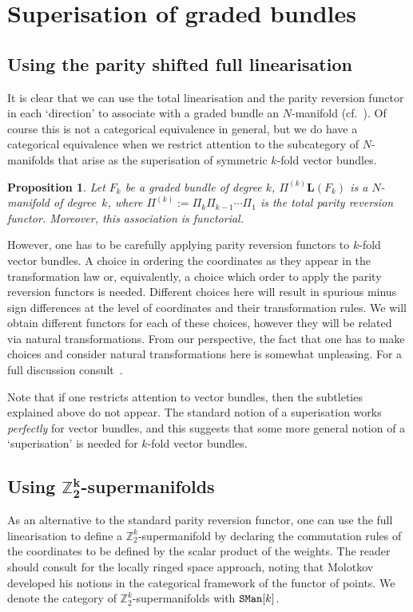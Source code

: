 \documentclass[pdftex]{sigma}
\newcommand{\catname}[1]{\textnormal{\texttt{#1}}}
\def\Linr{{\mathbf{L}}} %
\numberwithin{equation}{section}
\newtheorem{Proposition}[Theorem]{Proposition}
 { \theoremstyle{definition}
\newtheorem{Definition}[Theorem]{Definition}
\newtheorem{Example}[Theorem]{Example}
\newtheorem{Remark}[Theorem]{Remark} }
\begin{document}
\section{Superisation of graded bundles}\label{sec:superisation}

 \subsection{Using the parity shifted full linearisation}
 It is clear that we can use the total linearisation and the parity reversion functor in each `direction' to associate with a graded bundle an $N$-manifold (cf.~\cite{Grabowski:2006,Voronov:2012}). Of course this is not a categorical equivalence in general, but we do have a categorical equivalence when we restrict attention to the subcategory of $N$-manifolds that arise as the superisation of symmetric $k$-fold vector bundles.

 \begin{Proposition}
 Let $F_{k}$ be a graded bundle of degree $k$, $\Pi^{(k)}\Linr(F_{k})$ is a $N$-manifold of degree~$k$, where $\Pi^{(k)} := \Pi_{k} \Pi_{k-1} \cdots \Pi_{1}$ is the total parity reversion functor. Moreover, this association is functorial.
 \end{Proposition}

However, one has to be carefully applying parity reversion functors to $k$-fold vector bundles. A choice in ordering the coordinates as they appear in the transformation law or, equivalently, a choice which order to apply the parity reversion functors is needed. Dif\/ferent choices here will result in spurious minus sign dif\/ferences at the level of coordinates and their transformation rules. We will obtain dif\/ferent functors for each of these choices, however they will be related via natural transformations. From our perspective, the fact that one has to make choices and consider natural transformations here is somewhat unpleasing. For a full discussion con\-sult~\cite{Grabowski:2006,Voronov:2012}.

Note that if one restricts attention to vector bundles, then the subtleties explained above do not appear. The standard notion of a superisation works \emph{perfectly} for vector bundles, and this suggests that some more general notion of a `superisation' is needed for $k$-fold vector bundles.

\subsection[Using $\mathbb{Z}_{2}^{k}$-supermanifolds]{Using $\boldsymbol{\mathbb{Z}_{2}^{k}}$-supermanifolds}
As an alternative to the standard parity reversion functor, one can use the full linearisation to def\/ine a $\mathbb{Z}_{2}^{k}$-supermanifold by declaring the commutation rules of the coordinates to be def\/ined by the scalar product of the weights. The reader should consult \cite{Covolo:2014a,Covolo:2014b} for the locally ringed space approach, noting that Molotkov \cite{Molotkov:2010} developed his notions in the categorical framework of the functor of points. We denote the category of $\mathbb{Z}_{2}^{k}$-supermanifolds with $\catname{SMan}[k]$.
\end{document}

